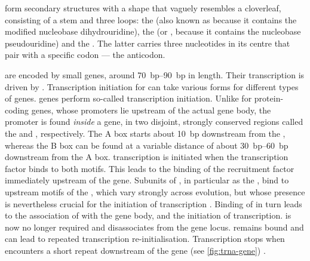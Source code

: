 \trna[s]
form secondary structures with a shape that vaguely resembles a
cloverleaf, consisting of a stem and three loops: the  (also
known as  because it contains the modified nucleobase
dihydrouridine), the  (or , because it contains
the nucleobase pseudouridine) and the . The latter
carries three nucleotides in its centre that pair with a specific codon --- the
anticodon.

\trna[s] are encoded by small genes, around \SIrange{70}{90}{bp} in length.
Their transcription is driven by . Transcription initiation for  can
take various forms for different types of genes. \trna genes perform so-called
  transcription initiation. Unlike for protein-coding
genes, whose promoters lie upstream of the actual gene body, the promoter is
found \emph{inside} a \trna gene, in two disjoint, strongly conserved regions
called the  and , respectively. The A box starts
about \SI{10}{bp} downstream from the \tss, whereas the B box can be found at a
variable distance of about \SIrange{30}{60}{bp} downstream from the A box. \trna
transcription is initiated when the transcription factor \tfiiic binds to both
motifs. This leads to the binding of the  recruitment factor \tfiiib
immediately upstream of the \trna gene. Subunits of \tfiiib, in particular as
the \tbp, bind to upstream motifs of the \trna, which vary strongly across
evolution, but whose presence is nevertheless crucial for the initiation of
transcription \citep{Palida:1993,White:1992}. Binding of \tfiiib in turn leads
to the association of  with the gene body, and the initiation of
transcription. \tfiiic is now no longer required and disassociates from the gene
locus. \tfiiib remains bound and can lead to repeated transcription
re-initialisation. Transcription stops when  encounters a short \nT repeat
downstream of the \trna gene (see \cref{fig:trna-gene})
\citep{White:1998,Dieci:2007}.

